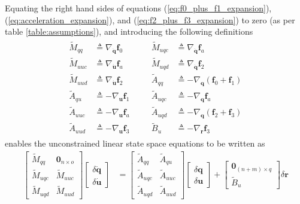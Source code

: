 \documentclass{svjour3}                     %
\begin{document}
Equating the right hand sides of equations (\ref{eq:f0_plus_f1_expansion}),
(\ref{eq:acceleration_expansion}),
and (\ref{eq:f2_plus_f3_expansion}) to zero (as per table
\ref{table:assumptions}), and introducing the following definitions
\begin{align}
    \label{eq:quant_to_compute}
    \begin{array}{llcll}
\tilde{M}_{qq}  &\triangleq \nabla_{\bm{\dot{q}}}\bm{f}_0 & \quad &
\tilde{M}_{uqc} &\triangleq \nabla_{\bm{\dot{q}}}\bm{f}_a \\
\tilde{M}_{uuc} &\triangleq \nabla_{\bm{\dot{u}}}\bm{f}_a & \quad &
\tilde{M}_{uqd} &\triangleq \nabla_{\bm{\dot{q}}}\bm{f}_2 \\
\tilde{M}_{uud} &\triangleq \nabla_{\bm{\dot{u}}}\bm{f}_2 & \quad &
\tilde{A}_{qq}  &\triangleq -\nabla_{\bm{q}}(\bm{f}_0 + \bm{f}_1) \\
\tilde{A}_{qu}  &\triangleq -\nabla_{\bm{u}}\bm{f}_1 & \quad &
\tilde{A}_{uqc} &\triangleq - \nabla_{\bm{q}} \bm{f}_a \\
\tilde{A}_{uuc} &\triangleq - \nabla_{\bm{u}} \bm{f}_a & \quad &
\tilde{A}_{uqd} &\triangleq - \nabla_{\bm{q}} (\bm{f}_2 + \bm{f}_3) \\
\tilde{A}_{uud} &\triangleq - \nabla_{\bm{u}} \bm{f}_3 & \quad &
\tilde{B}_{u}   &\triangleq -\nabla_{\bm{r}}\bm{f}_{3}
\end{array}
\end{align}
enables the unconstrained linear state space equations to be written as
\begin{align}
  \label{eq:state_space_unconstrained}
  \left[
    \begin{array}{cc}
      \tilde{M}_{qq} & \bm{0}_{n \times o} \\
      \tilde{M}_{uqc} & \tilde{M}_{uuc} \\
      \tilde{M}_{uqd} & \tilde{M}_{uud}
    \end{array}
    \right]
    \left[
      \begin{array}{c}
        \delta \bm{\dot{q}} \\
        \delta \bm{\dot{u}}
      \end{array}
    \right]
   &=
   \left[
     \begin{array}{cc}
       \tilde{A}_{qq} & \tilde{A}_{qu} \\
       \tilde{A}_{uqc} & \tilde{A}_{uuc} \\
       \tilde{A}_{uqd} & \tilde{A}_{uud}
     \end{array}
   \right]
    \left[
      \begin{array}{c}
        \delta \bm{q} \\
        \delta \bm{u}
      \end{array}
    \right]
    +
    \left[
      \begin{array}{c}
        \bm{0}_{(n + m) \times q} \\
        \tilde{B}_{u}
      \end{array}
    \right]
    \delta \bm{r}
\end{align}
\end{document}

